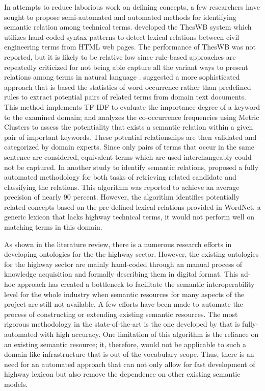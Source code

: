 \documentclass[Journal, BackFigs, DoubleSpace]{ascelike}%
\begin{document}
In attempts to reduce laborious work on defining concepts, a few researchers have sought to propose semi-automated and automated methods for identifying semantic relation among technical terms.  developed the ThesWB system which utilizes hand-coded syntax patterns to detect lexical relations between civil engineering terms from HTML web pages. The performance of ThesWB was not reported, but it is likely to be relative low since rule-based approaches are repeatedly criticized for not being able capture all the variant ways to present relations among terms in natural language \cite{Marcus95,navigli10}.  suggested a more sophisticated approach that is based the statistics of word occurrence rather than predefined rules to extract potential pairs of related terms from domain text documents. This method implements TF-IDF to evaluate the importance degree of a keyword to the examined domain; and analyzes the co-occurrence frequencies using Metric Clusters to assess the potentiality that exists a semantic relation within a given pair of important keywords. These potential relationships are then validated and categorized by domain experts. Since only pairs of terms that occur in the same sentence are considered, equivalent terms which are used interchangeably could not be captured. In another study to identify semantic relations,  proposed a fully automated methodology for both tasks of retrieving related candidate and classifying the relations. This algorithm was reported to achieve an average precision of nearly 90 percent. However, the algorithm identifies potentially related concepts based on the pre-defined lexical relations provided in WordNet, a generic lexicon that lacks highway technical terms, it would not perform well on matching terms in this domain.
\par
As shown in the literature review, there is a numerous research efforts in developing ontologies for the the highway sector. However, the existing ontologies for the highway sector are mainly hand-coded through an manual process of knowledge acquisition and formally describing them in digital format. This ad-hoc approach has created a bottleneck to facilitate the semantic interoperability level for the whole industry when semantic resources for many aspects of the project are still not available. A few efforts have been made to automate the process of constructing or extending existing semantic resources. The most rigorous methodology in the state-of-the-art is the one developed by  that is fully-automated with high accuracy. One limitation of this algorithm is the reliance on an existing semantic resource; it, therefore, would not be applicable to such a domain like infrastructure that is out of the vocabulary scope. Thus, there is an need for an automated approach that can not only allow for fast development of highway lexicon but also remove the dependence on other existing semantic models. 
\end{document}
